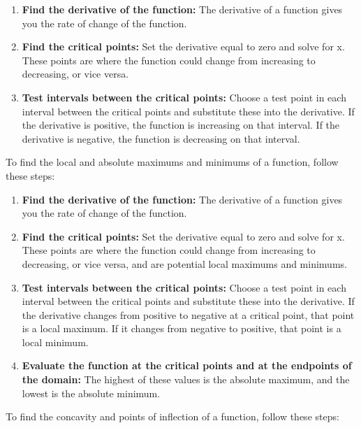 \documentclass{article}
\begin{document}
\begin{enumerate}
    \item \textbf{Find the derivative of the function:} The derivative of a function gives you the rate of change of the function. 
    \item \textbf{Find the critical points:} Set the derivative equal to zero and solve for x. These points are where the function could change from increasing to decreasing, or vice versa.
    \item \textbf{Test intervals between the critical points:} Choose a test point in each interval between the critical points and substitute these into the derivative. If the derivative is positive, the function is increasing on that interval. If the derivative is negative, the function is decreasing on that interval.
\end{enumerate}

To find the local and absolute maximums and minimums of a function, follow these steps:

\begin{enumerate}
    \item \textbf{Find the derivative of the function:} The derivative of a function gives you the rate of change of the function.
    \item \textbf{Find the critical points:} Set the derivative equal to zero and solve for x. These points are where the function could change from increasing to decreasing, or vice versa, and are potential local maximums and minimums.
    \item \textbf{Test intervals between the critical points:} Choose a test point in each interval between the critical points and substitute these into the derivative. If the derivative changes from positive to negative at a critical point, that point is a local maximum. If it changes from negative to positive, that point is a local minimum.
    \item \textbf{Evaluate the function at the critical points and at the endpoints of the domain:} The highest of these values is the absolute maximum, and the lowest is the absolute minimum.
\end{enumerate}

To find the concavity and points of inflection of a function, follow these steps:
\end{document}
